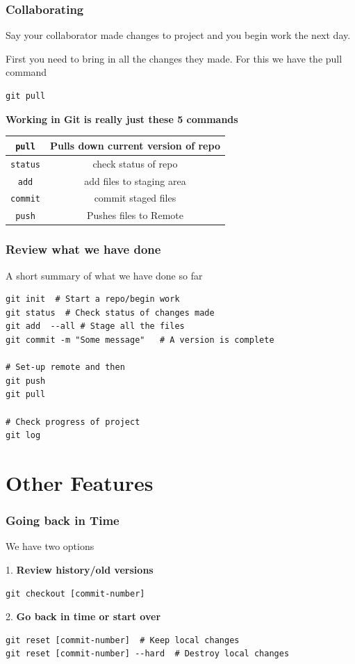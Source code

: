 \documentclass{beamer}
\begin{document}
\begin{frame}[fragile]
\frametitle{Collaborating }
Say your collaborator made changes to project and you begin work the next day.

First you need to bring in all the changes they made. For this we have the pull command
\begin{verbatim}
git pull
\end{verbatim}

\pause

\textbf{Working in Git is really just these 5 commands}
\begin{tabular}{c|c}
\hline
\texttt{pull} & Pulls down current version of repo\\
\hline
\texttt{status} & check status of repo\\
\texttt{add} & add files to staging area\\
\texttt{commit} & commit staged files\\
\hline
\texttt{push} & Pushes files to Remote\\
\hline
\end{tabular}
\end{frame}


\begin{frame}[fragile]
\frametitle{Review what we have done}
A short summary of what we have done so far
\begin{verbatim}
git init  # Start a repo/begin work
git status  # Check status of changes made
git add  --all # Stage all the files
git commit -m "Some message"   # A version is complete

# Set-up remote and then
git push
git pull

# Check progress of project
git log
\end{verbatim}
\end{frame}


\section{Other Features}


\begin{frame}[fragile]
\frametitle{Going back in Time}
We have two options 

1. \textbf{Review history/old versions}
\begin{verbatim}
git checkout [commit-number] 
\end{verbatim}

2. \textbf{Go back in time or start over}
\begin{verbatim}
git reset [commit-number]  # Keep local changes
git reset [commit-number] --hard  # Destroy local changes
\end{verbatim}
\end{frame}
\end{document}
